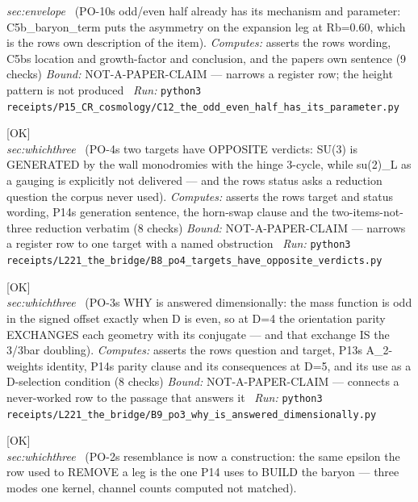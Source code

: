 \begin{description}
\textit{sec:envelope} \ (PO-10s odd/even half already has its mechanism and parameter: C5b\_baryon\_term puts the asymmetry on the expansion leg at Rb=0.60, which is the rows own description of the item). 
\emph{Computes:} asserts the rows wording, C5bs location and growth-factor and conclusion, and the papers own sentence (9 checks)
 \emph{Bound:} NOT-A-PAPER-CLAIM --- narrows a register row; the height pattern is not produced
\ \emph{Run:} \texttt{python3 receipts/P15\_CR\_cosmology/C12\_the\_odd\_even\_half\_has\_its\_parameter.py}
\item[\label{rcpt:B8_po4_targets_have_opposite_verdicts}\texttt{B8\_po4\_targets\_have\_opposite\_verdicts}]\hfill\textsf{[OK]}\\
\textit{sec:whichthree} \ (PO-4s two targets have OPPOSITE verdicts: SU(3) is GENERATED by the wall monodromies with the hinge 3-cycle, while su(2)\_L as a gauging is explicitly not delivered --- and the rows status asks a reduction question the corpus never used). 
\emph{Computes:} asserts the rows target and status wording, P14s generation sentence, the horn-swap clause and the two-items-not-three reduction verbatim (8 checks)
 \emph{Bound:} NOT-A-PAPER-CLAIM --- narrows a register row to one target with a named obstruction
\ \emph{Run:} \texttt{python3 receipts/L221\_the\_bridge/B8\_po4\_targets\_have\_opposite\_verdicts.py}
\item[\label{rcpt:B9_po3_why_is_answered_dimensionally}\texttt{B9\_po3\_why\_is\_answered\_dimensionally}]\hfill\textsf{[OK]}\\
\textit{sec:whichthree} \ (PO-3s WHY is answered dimensionally: the mass function is odd in the signed offset exactly when D is even, so at D=4 the orientation parity EXCHANGES each geometry with its conjugate --- and that exchange IS the 3/3bar doubling). 
\emph{Computes:} asserts the rows question and target, P13s A\_2-weights identity, P14s parity clause and its consequences at D=5, and its use as a D-selection condition (8 checks)
 \emph{Bound:} NOT-A-PAPER-CLAIM --- connects a never-worked row to the passage that answers it
\ \emph{Run:} \texttt{python3 receipts/L221\_the\_bridge/B9\_po3\_why\_is\_answered\_dimensionally.py}
\item[\label{rcpt:B10_po2_resemblance_is_now_a_construction}\texttt{B10\_po2\_resemblance\_is\_now\_a\_construction}]\hfill\textsf{[OK]}\\
\textit{sec:whichthree} \ (PO-2s resemblance is now a construction: the same epsilon the row used to REMOVE a leg is the one P14 uses to BUILD the baryon --- three modes one kernel, channel counts computed not matched). 

\end{description}
